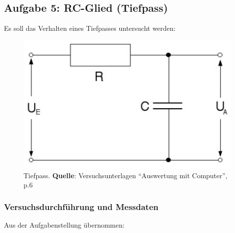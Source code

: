 \clearpage
\subsection{Aufgabe 5: RC-Glied (Tiefpass)}

Es soll das Verhalten eines Tiefpasses untersucht werden:
\begin{figure}[th!]
    \centering
    \includegraphics[width=.4\textwidth]{images/rc-glied.png}
    \caption{Tiefpass. \textbf{Quelle}: Versuchsunterlagen ``Auswertung mit Computer'', p.6}
    \label{fig:rcGlied}
\end{figure}

\subsubsection{Versuchsdurchf\"uhrung und Messdaten}

Aus der Aufgabenstellung \"ubernommen:

